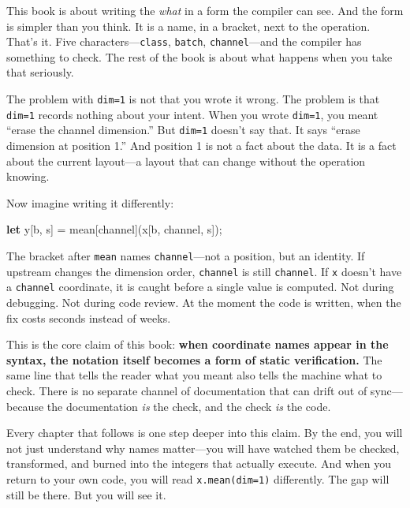 \documentclass[11pt,titlepage]{article}
\newenvironment{Shaded}{}{}
\newcommand{\KeywordTok}[1]{\textcolor[rgb]{0.00,0.44,0.13}{\textbf{#1}}}
\newcommand{\NormalTok}[1]{#1}
\newcommand{\OperatorTok}[1]{\textcolor[rgb]{0.40,0.40,0.40}{#1}}
\begin{document}
This book is about writing the \emph{what} in a form the compiler can
see. And the form is simpler than you think. It is a name, in a bracket,
next to the operation. That's it. Five characters---\texttt{class},
\texttt{batch}, \texttt{channel}---and the compiler has something to
check. The rest of the book is about what happens when you take that
seriously.

\vspace{2em}

The problem with \texttt{dim=1} is not that you wrote it wrong. The
problem is that \texttt{dim=1} records nothing about your intent. When
you wrote \texttt{dim=1}, you meant ``erase the channel dimension.'' But
\texttt{dim=1} doesn't say that. It says ``erase dimension at position
1.'' And position 1 is not a fact about the data. It is a fact about the
current layout---a layout that can change without the operation knowing.

Now imagine writing it differently:

\begin{Shaded}
\begin{Highlighting}[]
\KeywordTok{let}\NormalTok{ y}\OperatorTok{[}\NormalTok{b, s}\OperatorTok{]}\NormalTok{ = mean}\OperatorTok{[}\NormalTok{channel}\OperatorTok{]}\NormalTok{(x}\OperatorTok{[}\NormalTok{b, channel, s}\OperatorTok{]}\NormalTok{);}
\end{Highlighting}
\end{Shaded}

The bracket after \texttt{mean} names \texttt{channel}---not a position,
but an identity. If upstream changes the dimension order,
\texttt{channel} is still \texttt{channel}. If \texttt{x} doesn't have a
\texttt{channel} coordinate, it is caught before a single value is
computed. Not during debugging. Not during code review. At the moment
the code is written, when the fix costs seconds instead of weeks.

This is the core claim of this book: \textbf{when coordinate names
appear in the syntax, the notation itself becomes a form of static
verification.} The same line that tells the reader what you meant also
tells the machine what to check. There is no separate channel of
documentation that can drift out of sync---because the documentation
\emph{is} the check, and the check \emph{is} the code.

Every chapter that follows is one step deeper into this claim. By the
end, you will not just understand why names matter---you will have
watched them be checked, transformed, and burned into the integers that
actually execute. And when you return to your own code, you will read
\texttt{x.mean(dim=1)} differently. The gap will still be there. But you
will see it.
\end{document}
